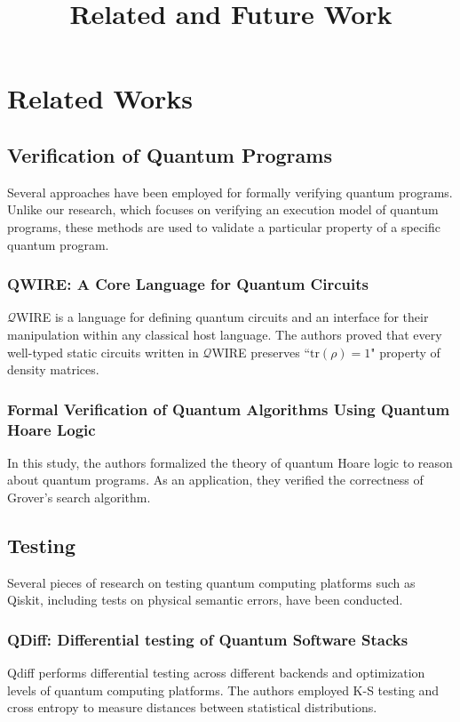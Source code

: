 \documentclass[10pt,a4paper]{article}
\title{Related and Future Work}
\date{}
\newcommand{\<}{\langle}
\renewcommand{\>}{\rangle}
\newcommand{\prths}[1]{\left( #1 \right)}
\begin{document}
\maketitle

\section{Related Works}

\subsection{Verification of Quantum Programs}
Several approaches have been employed for formally verifying quantum programs.
Unlike our research, which focuses on verifying an execution model of quantum
programs, these methods are used to validate a particular property of a specific
quantum program.

\subsubsection{QWIRE: A Core Language for Quantum Circuits}
$\mathcal{Q}$WIRE is a language for defining quantum circuits and an interface
for their manipulation within any classical host language. The
authors proved that every well-typed static circuits written in
$\mathcal{Q}$WIRE preserves ``$\textrm{tr}\prths{\rho} = 1$" property of density
matrices.

\subsubsection{Formal Verification of Quantum Algorithms Using Quantum Hoare Logic}
In this study, the authors formalized the theory of quantum Hoare logic to
reason about quantum programs. As an application, they verified the correctness
of Grover's search algorithm.

\subsection{Testing}
Several pieces of research on testing quantum computing platforms such as
Qiskit, including tests on physical semantic errors, have been conducted.

\subsubsection{QDiff: Differential testing of Quantum Software Stacks}
Qdiff performs differential testing across different backends and optimization
levels of quantum computing platforms. The authors employed K-S testing and cross
entropy to measure distances between statistical distributions.
\end{document}
